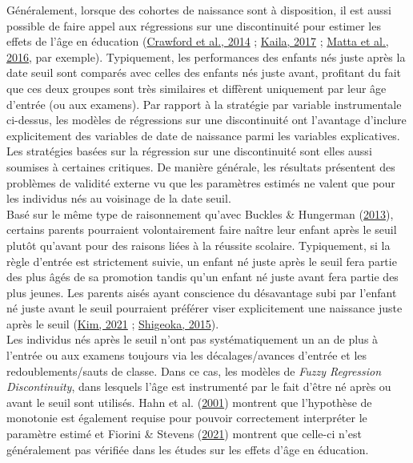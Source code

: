 \documentclass[
]{book}
\begin{document}
\quad Généralement, lorsque des cohortes de naissance sont à disposition, il est aussi possible de faire appel aux régressions sur une discontinuité pour estimer les effets de l'âge en éducation (\protect\hyperlink{ref-CRA:eal:14}{Crawford et al., 2014} ; \protect\hyperlink{ref-KAI:17}{Kaila, 2017} ; \protect\hyperlink{ref-MAT:eal:16}{Matta et al., 2016}, par exemple). Typiquement, les performances des enfants nés juste après la date seuil sont comparés avec celles des enfants nés juste avant, profitant du fait que ces deux groupes sont très similaires et diffèrent uniquement par leur âge d'entrée (ou aux examens). Par rapport à la stratégie par variable instrumentale ci-dessus, les modèles de régressions sur une discontinuité ont l'avantage d'inclure explicitement des variables de date de naissance parmi les variables explicatives.\\
Les stratégies basées sur la régression sur une discontinuité sont elles aussi soumises à certaines critiques. De manière générale, les résultats présentent des problèmes de validité externe vu que les paramètres estimés ne valent que pour les individus nés au voisinage de la date seuil.\\
Basé sur le même type de raisonnement qu'avec Buckles \& Hungerman (\protect\hyperlink{ref-BUC:HUN:13}{2013}), certains parents pourraient volontairement faire naître leur enfant après le seuil plutôt qu'avant pour des raisons liées à la réussite scolaire. Typiquement, si la règle d'entrée est strictement suivie, un enfant né juste après le seuil fera partie des plus âgés de sa promotion tandis qu'un enfant né juste avant fera partie des plus jeunes. Les parents aisés ayant conscience du désavantage subi par l'enfant né juste avant le seuil pourraient préférer viser explicitement une naissance juste après le seuil (\protect\hyperlink{ref-KIM:21}{Kim, 2021} ; \protect\hyperlink{ref-SHI:15}{Shigeoka, 2015}).\\
Les individus nés après le seuil n'ont pas systématiquement un an de plus à l'entrée ou aux examens toujours via les décalages/avances d'entrée et les redoublements/sauts de classe. Dans ce cas, les modèles de \emph{Fuzzy Regression Discontinuity}, dans lesquels l'âge est instrumenté par le fait d'être né après ou avant le seuil sont utilisés. Hahn et al. (\protect\hyperlink{ref-HAH:eal:01}{2001}) montrent que l'hypothèse de monotonie est également requise pour pouvoir correctement interpréter le paramètre estimé et Fiorini \& Stevens (\protect\hyperlink{ref-FIO:STE:21}{2021}) montrent que celle-ci n'est généralement pas vérifiée dans les études sur les effets d'âge en éducation.
\end{document}
